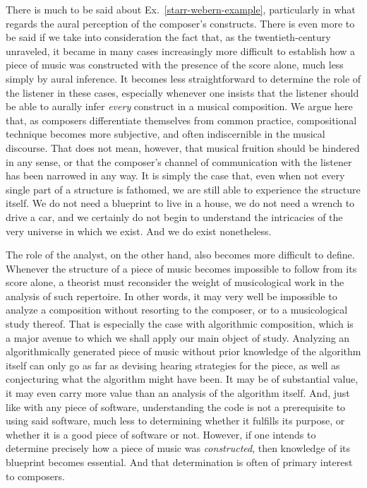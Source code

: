 There is much to be said about Ex.~\ref{starr-webern-example}, particularly in what regards the aural perception of the composer's constructs. There is even more to be said if we take into consideration the fact that, as the twentieth-century unraveled, it became in many cases increasingly more difficult to establish how a piece of music was constructed with the presence of the score alone, much less simply by aural inference. It becomes less straightforward to determine the role of the listener in these cases, especially whenever one insists that the listener should be able to aurally infer \emph{every} construct in a musical composition. We argue here that, as composers differentiate themselves from common practice, compositional technique becomes more subjective, and often indiscernible in the musical discourse. That does not mean, however, that musical fruition should be hindered in any sense, or that the composer's channel of communication with the listener has been narrowed in any way. It is simply the case that, even when not every single part of a structure is fathomed, we are still able to experience the structure itself. We do not need a blueprint to live in a house, we do not need a wrench to drive a car, and we certainly do not begin to understand the intricacies of the very universe in which we exist. And we do exist nonetheless.

The role of the analyst, on the other hand, also becomes more difficult to define. Whenever the structure of a piece of music becomes impossible to follow from its score alone, a theorist must reconsider the weight of musicological work in the analysis of such repertoire. In other words, it may very well be impossible to analyze a composition without resorting to the composer, or to a musicological study thereof. That is especially the case with algorithmic composition, which is a major avenue to which we shall apply our main object of study. Analyzing an algorithmically generated piece of music without prior knowledge of the algorithm itself can only go as far as devising hearing strategies for the piece, as well as conjecturing what the algorithm might have been. It may be of substantial value, it may even carry more value than an analysis of the algorithm itself. And, just like with any piece of software, understanding the code is not a prerequisite to using said software, much less to determining whether it fulfills its purpose, or whether it is a good piece of software or not. However, if one intends to determine precisely how a piece of music was \emph{constructed}, then knowledge of its blueprint becomes essential. And that determination is often of primary interest to composers.

